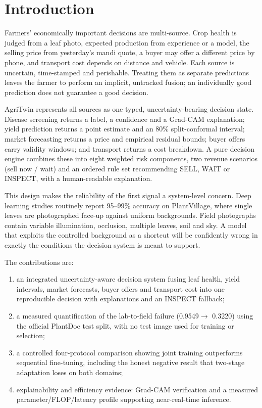 \documentclass[journal,twocolumn,10pt]{IEEEtran}
\newcommand{\EonePV}{0.9549}
\newcommand{\EonePD}{0.3220}
\begin{document}
\section{Introduction}
\label{sec:intro}

Farmers' economically important decisions are multi-source. Crop health is judged from a leaf
photo, expected production from experience or a model, the selling price from yesterday's mandi
quote, a buyer may offer a different price by phone, and transport cost depends on distance and
vehicle. Each source is uncertain, time-stamped and perishable. Treating them as separate
predictions leaves the farmer to perform an implicit, untracked fusion; an individually good
prediction does not guarantee a good decision.

AgriTwin represents all sources as one typed, uncertainty-bearing decision state. Disease
screening returns a label, a confidence and a Grad-CAM explanation; yield prediction returns a
point estimate and an 80\% split-conformal interval; market forecasting returns a price and
empirical residual bounds; buyer offers carry validity windows; and transport returns a cost
breakdown. A pure decision engine combines these into eight weighted risk components, two revenue
scenarios (sell now / wait) and an ordered rule set recommending SELL, WAIT or INSPECT, with a
human-readable explanation.

This design makes the reliability of the first signal a system-level concern. Deep learning
studies routinely report 95--99\% accuracy on PlantVillage, where single leaves are photographed
face-up against uniform backgrounds. Field photographs contain variable illumination, occlusion,
multiple leaves, soil and sky. A model that exploits the controlled background as a shortcut will
be confidently wrong in exactly the conditions the decision system is meant to support.

The contributions are:
\begin{enumerate}
  \item an integrated uncertainty-aware decision system fusing leaf health, yield intervals,
        market forecasts, buyer offers and transport cost into one reproducible decision with
        explanations and an INSPECT fallback;
  \item a measured quantification of the lab-to-field failure (\EonePV $\to$ \EonePD) using the
        official PlantDoc test split, with no test image used for training or selection;
  \item a controlled four-protocol comparison showing joint training outperforms sequential
        fine-tuning, including the honest negative result that two-stage adaptation loses on
        both domains;
  \item explainability and efficiency evidence: Grad-CAM verification and a measured
        parameter/FLOP/latency profile supporting near-real-time inference.
\end{enumerate}
\end{document}
